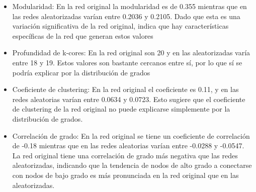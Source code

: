 \documentclass[12pt]{article}
\begin{document}
\begin{itemize}
	\item Modularidad: En la red original la modularidad es de 0.355 mientras que en las redes aleatorizadas varían entre 0.2036 y 0.2105. Dado que esta es una variación significativa de la red original, indica que hay características específicas de la red que generan estos valores

	\item Profundidad de k-cores: En la red original son 20 y en las aleatorizadas varía entre 18 y 19. Estos valores son bastante cercanos entre sí, por lo que sí se podría explicar por la distribución de grados

	\item Coeficiente de clustering: En la red original el coeficiente es 0.11, y en las redes aleatorias varían entre 0.0634 y 0.0723. Esto sugiere que el coeficiente de clustering de la red original no puede explicarse simplemente por la distribución de grados.

	\item Correlación de grado: En la red original se tiene un coeficiente de correlación de  -0.18 mientras que en las redes aleatorias varían entre -0.0288 y -0.0547. La red original tiene una correlación de grado más negativa que las redes aleatorizadas, indicando que la tendencia de nodos de alto grado a conectarse con nodos de bajo grado es más pronunciada en la red original que en las aleatorizadas.
\end{itemize}
\end{document}
